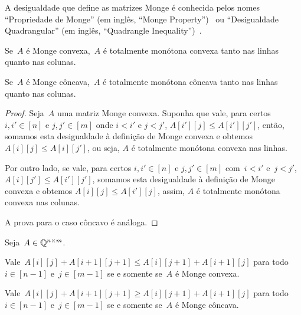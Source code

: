 A desigualdade que define as matrizes Monge é conhecida pelos nomes ``Propriedade de Monge'' (em inglês, ``Monge Property'')~\cite{Burkard:1996} ou ``Desigualdade Quadrangular'' (em inglês, ``Quadrangle Inequality'')~\cite{Yao:1980,Bein:2009}.

\begin{lema}
Se~$A$ é Monge convexa,~$A$ é totalmente monótona convexa tanto nas linhas quanto nas colunas.  

Se~$A$ é Monge côncava,~$A$ é totalmente monótona côncava tanto nas linhas quanto nas colunas.
\end{lema}

\begin{proof}
Seja~$A$ uma matriz Monge convexa. Suponha que vale, para certos $i,i' \in [n]$ e $j,j' \in [m]$ onde $i < i'$ e $j < j'$, $A[i'][j] \leq A[i'][j']$, então, somamos esta desigualdade à definição de Monge convexa e obtemos $A[i][j] \leq A[i][j']$, ou seja, $A$ é totalmente monótona convexa nas linhas.  

Por outro lado, se vale, para certos $i,i' \in [n]$ e $j,j' \in [m]$ com~${i < i'}$ e~${j < j'}$, $A[i][j'] \leq A[i'][j']$, somamos esta desigualdade à definição de Monge convexa e obtemos $A[i][j] \leq A[i'][j]$, assim, $A$ é totalmente monótona convexa nas colunas.  

A prova para o caso côncavo é análoga.
\end{proof}

\begin{theo} \label{Monge:theo+1}
Seja~$A \in \mathbb{Q}^{n \times m}$.

Vale~${A[i][j] + A[i+1][j+1] \leq A[i][j+1] + A[i+1][j]}$ para todo~${i \in [n-1]}$ e~${j \in [m-1]}$ se e somente se~$A$ é Monge convexa.

Vale~${A[i][j] + A[i+1][j+1] \geq A[i][j+1] + A[i+1][j]}$ para todo~${i \in [n-1]}$ e~${j \in [m-1]}$ se e somente se~$A$ é Monge côncava.
\end{theo}

